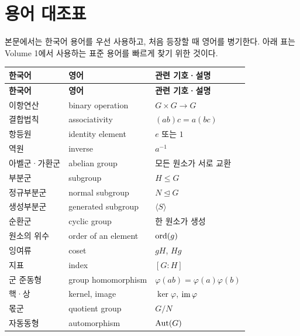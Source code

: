 \chapter*{용어 대조표}

본문에서는 한국어 용어를 우선 사용하고, 처음 등장할 때 영어를 병기한다. 아래 표는 Volume 1에서 사용하는 표준 용어를 빠르게 찾기 위한 것이다.

\renewcommand{\arraystretch}{1.22}
\begin{longtable}{>{\raggedright\arraybackslash}p{}>{\raggedright\arraybackslash}p{}p{}}
\toprule
\textbf{한국어} & \textbf{영어} & \textbf{관련 기호·설명} \\
\midrule
\endfirsthead
\toprule
\textbf{한국어} & \textbf{영어} & \textbf{관련 기호·설명} \\
\midrule
\endhead
\bottomrule
\endfoot

이항연산 & binary operation & $G\times G\to G$ \\
결합법칙 & associativity & $(ab)c=a(bc)$ \\
항등원 & identity element & $e$ 또는 $1$ \\
역원 & inverse & $a^{-1}$ \\
아벨군·가환군 & abelian group & 모든 원소가 서로 교환 \\
부분군 & subgroup & $H\le G$ \\
정규부분군 & normal subgroup & $N\trianglelefteq G$ \\
생성부분군 & generated subgroup & $\langle S\rangle$ \\
순환군 & cyclic group & 한 원소가 생성 \\
원소의 위수 & order of an element & $\operatorname{ord}(g)$ \\
잉여류 & coset & $gH$, $Hg$ \\
지표 & index & $[G:H]$ \\
군 준동형 & group homomorphism & $\varphi(ab)=\varphi(a)\varphi(b)$ \\
핵·상 & kernel, image & $\ker\varphi$, $\operatorname{im}\varphi$ \\
몫군 & quotient group & $G/N$ \\
자동동형 & automorphism & $\operatorname{Aut}(G)$ \\


\end{longtable}
